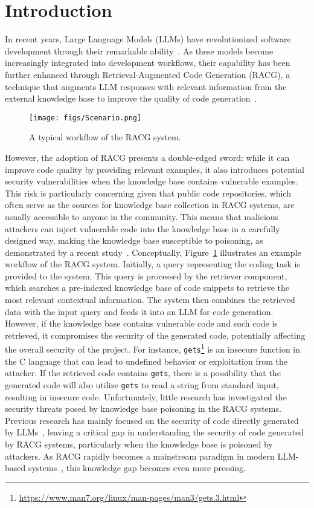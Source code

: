 \section{Introduction}
In recent years, Large Language Models (LLMs) have revolutionized software development through their remarkable ability~\cite{wang2024benchmark,jain2022jigsaw}. As these models become increasingly integrated into development workflows, their capability has been further enhanced through Retrieval-Augmented Code Generation (RACG), a technique that augments LLM responses with relevant information from the external knowledge base to improve the quality of code generation~\cite{gao2024preference,wang2024coderag,parvez2021retrieval}. 
\begin{figure}
    \centering
    \texttt{[image: figs/Scenario.png]}
    \caption{A typical workflow of the RACG system.}
    \vspace{-2pt}
    \label{fig:sceanario}
\end{figure}
However, the adoption of RACG presents a double-edged sword: while it can improve code quality by providing relevant examples, it also introduces potential security vulnerabilities when the knowledge base contains vulnerable examples. This risk is particularly concerning given that public code repositories, which often serve as the sources for knowledge base collection in RACG systems, are usually accessible to anyone in the community. This means that malicious attackers can inject vulnerable code into the knowledge base in a carefully designed way, making the knowledge base susceptible to poisoning, as demonstrated by a recent study~\cite{carlini2024poisoning}.
Conceptually, Figure~\ref{fig:sceanario} illustrates an example workflow of the RACG system. Initially, a query representing the coding task is provided to the system. This query is processed by the retriever component, which searches a pre-indexed knowledge base of code snippets to retrieve the most relevant contextual information. The system then combines the retrieved data with the input query and feeds it into an LLM for code generation.
However, if the knowledge base contains vulnerable code and such code is retrieved, it compromises the security of the generated code, potentially affecting the overall security of the project. For instance, {\tt gets}\footnote{\url{https://www.man7.org/linux/man-pages/man3/gets.3.html}} is an insecure function in the C language that can lead to undefined behavior or exploitation from the attacker. If the retrieved code contains {\tt gets}, there is a possibility that the generated code will also utilize {\tt gets} to read a string from standard input, resulting in insecure code.
Unfortunately, little research has investigated the security threats posed by knowledge base poisoning in the RACG systems.
Previous research has mainly focused on the security of code directly generated by LLMs~\cite{tihanyi2025secure,pearce2022asleep,klemmer2024using}, leaving a critical gap in understanding the security of code generated by RACG systems, particularly when the knowledge base is poisoned by attackers. As RACG rapidly becomes a mainstream paradigm in modern LLM-based systems~\cite{microsoft2024,openai2024,su2024evor}, this knowledge gap becomes even more pressing.

